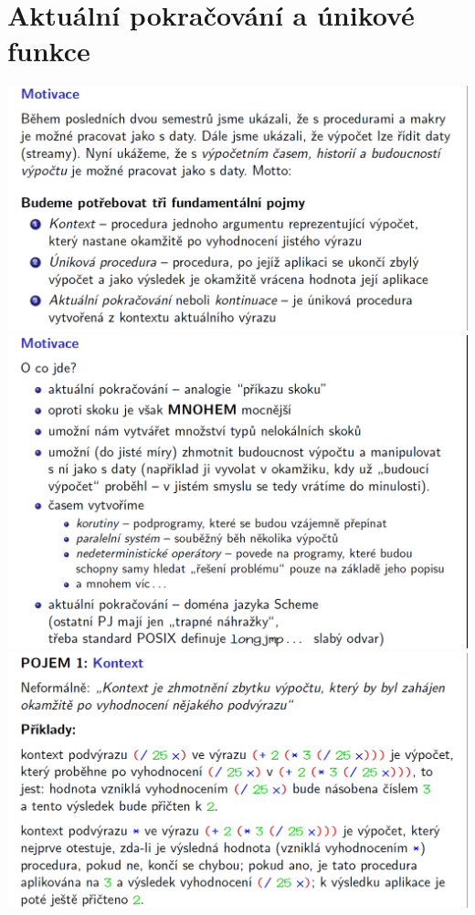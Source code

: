 \documentclass[10pt,a4paper]{article}
\begin{document}
\section{Aktuální pokračování a únikové funkce}
\begin{center}
	\includegraphics[scale=0.35]{img/aktualni_pokracovani_1}
	\includegraphics[scale=0.35]{img/aktualni_pokracovani_2}
	\includegraphics[scale=0.35]{img/aktualni_pokracovani_3}

\end{center}
\end{document}
